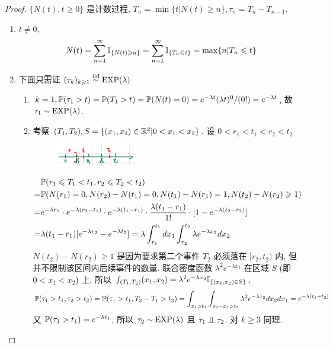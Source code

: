 \begin{proof}
$\{N(t),t\geq 0\}$ 是计数过程, $T_n=\min\{t|N(t)\geq n\}, \tau_n=T_n-T_{n-1}$.
\begin{enumerate}
    \item $t\neq 0$, 
    \[
    N(t)=\sum_{n=1}^{\infty}\mathbb I_{\{N(t)\geqslant n\}}=\sum_{n=1}^{\infty}\mathbb I_{\{T_n\leqslant t\}}=\max\{n|T_n\leqslant t\}
    \]
    \item 下面只需证 $(\tau_k)_{k\geqslant 1}\overset{\text{iid}}{\sim}\operatorname{EXP}(\lambda)$
    \begin{enumerate}
        \item $k=1, \mathbb{P}(\tau_1>t)=\mathbb{P}(T_1>t)=\mathbb{P}(N(t)=0)=e^{-\lambda t}(\lambda t)^0/(0!)=e^{-\lambda t}$, 故 $\tau_1\sim\operatorname{EXP}(\lambda)$.
        \item 考察 $(T_1,T_2), S=\{(x_1,x_2)\in \mathbb{R}^2|0<x_1<x_2\}$. 设 $0<r_1<t_1<r_2<t_2$
        \begin{figure}[H]
            \centering
            \includegraphics[width=0.35\textwidth]{figures/note-p102.png}
        \end{figure}
        \[
        \begin{aligned}
            &\mathbb{P}(r_1\leqslant T_1<t_1,r_2\leqslant T_2<t_2) \\
            =&\mathbb{P}(N(r_1)=0,N(r_2)-N(t_1)=0,N(t_1)-N(r_1)=1,N(t_2)-N(r_2)\geqslant 1)\\
            =&e^{-\lambda r_1}\cdot e^{-\lambda (r_2-t_1)}\cdot e^{-\lambda (t_1-r_1)}\cdot \frac{\lambda (t_1-r_1)}{1!}\cdot [1-e^{-\lambda (t_2-r_2)}]\\
            =&\lambda (t_1-r_1)[e^{-\lambda r_2}-e^{-\lambda t_2}]=\lambda\int_{r_1}^{t_1}dx_1\int_{r_2}^{t_2}\lambda e^{-\lambda x_2}dx_2
        \end{aligned}
        \]
        $N(t_2)-N(r_2)\geq 1$ 是因为要求第二个事件 $T_2$ 必须落在 $[r_2,t_2)$ 内, 但并不限制该区间内后续事件的数量. 联合密度函数 $\lambda^2 e^{-\lambda x_2}$ 在区域 $S$ (即 $0<x_1<x_2$) 上, 所以 $f_{(T_1,T_2)}(x_1,x_2)=\lambda^2 e^{-\lambda x_2}\mathbb I_{\{(x_1,x_2)\in S\}}$.
        \[
        \mathbb{P}(\tau_1>t_1,\tau_2>t_2)=\mathbb{P}(\tau_1>t_1,T_2-T_1>t_2)=\int_{x_1>t_1}\int_{x_2-x_1>t_2}\lambda^2 e^{-\lambda x_2}dx_2 dx_1=e^{-\lambda (t_1+t_2)}
        \]
        又 $\mathbb{P}(\tau_1>t_1)=e^{-\lambda t_1}$, 所以 $\tau_2\sim \operatorname{EXP}(\lambda)$ 且 $\tau_1\operatorname{\perp\!\!\!\perp} \tau_2$. 对 $k\geq 3$ 同理.
    \end{enumerate}
\end{enumerate}
\end{proof}

